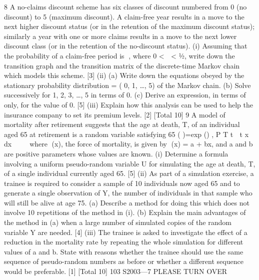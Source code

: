 \documentclass[a4paper,12pt]{article}
\begin{document}
\begin{enumerate}

8 A no-claims discount scheme has six classes of discount numbered from 0 (no
discount) to 5 (maximum discount). A claim-free year results in a move to the next
higher discount status (or in the retention of the maximum discount status); similarly a
year with one or more claims results in a move to the next lower discount class (or in
the retention of the no-discount status).
(i) Assuming that the probability of a claim-free period is , where 0 <  < ½,
write down the transition graph and the transition matrix of the discrete-time
Markov chain which models this scheme. [3]
(ii) (a) Write down the equations obeyed by the stationary probability
distribution 
 = (
0, 
1, …, 
5) of the Markov chain.
(b) Solve successively for 
1, 
2, 
3, …, 
5 in terms of 
0.
(c) Derive an expression, in terms of  only, for the value of 
0.
[5]
(iii) Explain how this analysis can be used to help the insurance company to set its
premium levels. [2]
[Total 10]
9 A model of mortality after retirement suggests that the age at death, T, of an
individual aged 65 at retirement is a random variable satisfying
65
( )=exp () ,
P T t  t x dx     
 	 
where (x), the force of mortality, is given by (x) = a + bx, and a and b are positive
parameters whose values are known.
(i) Determine a formula involving a uniform pseudo-random variable U for
simulating the age at death, T, of a single individual currently aged 65. [5]
(ii) As part of a simulation exercise, a trainee is required to consider a sample of
10 individuals now aged 65 and to generate a single observation of Y, the
number of individuals in that sample who will still be alive at age 75.
(a) Describe a method for doing this which does not involve 10 repetitions
of the method in (i).
(b) Explain the main advantages of the method in (a) when a large number
of simulated copies of the random variable Y are needed. [4]
(iii) The trainee is asked to investigate the effect of a reduction in the mortality rate
by repeating the whole simulation for different values of a and b. State with
reasons whether the trainee should use the same sequence of pseudo-random
numbers as before or whether a different sequence would be preferable. [1]
[Total 10]
103 S2003—7 PLEASE TURN OVER


\end{enumerate}
\end{document}
